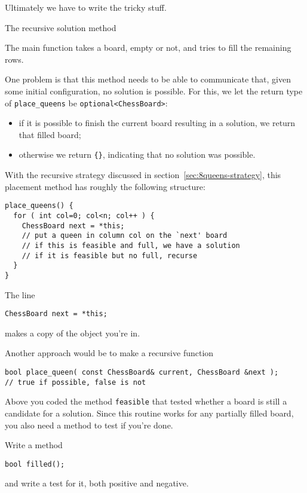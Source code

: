 Ultimately we have to write the tricky stuff.

 {The recursive solution method}

The main function
takes a board, empty or not, and tries to fill the remaining rows.

One problem is that this method needs to be able to communicate
that, given some initial configuration, no solution is possible.
For this, we let the return type of \lstinline+place_queens+
be \lstinline+optional<ChessBoard>+:
\begin{itemize}
\item if it is possible to finish the current board resulting in a solution,
  we return that filled board;
\item otherwise we return \lstinline+{}+, indicating that no solution was possible.
\end{itemize}

With the recursive strategy discussed in section~\ref{sec:8queens-strategy},
this placement method has roughly the following structure:
\begin{lstlisting}
place_queens() {
  for ( int col=0; col<n; col++ ) {
    ChessBoard next = *this;
    // put a queen in column col on the `next' board
    // if this is feasible and full, we have a solution
    // if it is feasible but no full, recurse
  }
}
\end{lstlisting}

The line
\begin{lstlisting}
ChessBoard next = *this;
\end{lstlisting}
makes a copy of the object you're in.

\begin{remark}
  Another approach would be to  make a recursive function
\begin{lstlisting}
bool place_queen( const ChessBoard& current, ChessBoard &next );
// true if possible, false is not
\end{lstlisting}
\end{remark}


Above you coded the method \lstinline+feasible+
that tested whether a board is still a candidate for a solution.
Since this routine works for any partially filled board,
you also need a method to test if you're done.

\begin{exercise}
  Write a method
\begin{lstlisting}
bool filled();
\end{lstlisting}
  and write a test for it, both positive and negative.
\end{exercise}

